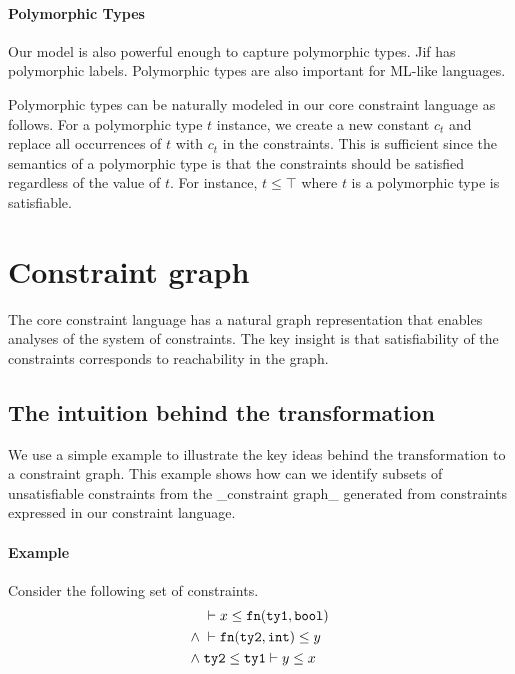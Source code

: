 
\paragraph{Polymorphic Types}

Our model is also powerful enough to capture polymorphic types.  Jif
has polymorphic labels. Polymorphic types are also important for
ML-like languages.

Polymorphic types can be naturally modeled in our core constraint
language as follows. For a polymorphic type $t$ instance, we create a
new constant $c_t$ and replace all occurrences of $t$ with $c_t$ in
the constraints. This is sufficient since the semantics of a
polymorphic type is that the constraints should be satisfied
regardless of the value of $t$. For instance, $t\leq \top$ where $t$
is a polymorphic type is satisfiable.
\fi

\section{Constraint graph} 
\label{sec:graph}

The core constraint language has a natural graph representation that
enables analyses of the system of constraints. The key insight is that
satisfiability of the constraints corresponds to reachability in the
graph.


\subsection{The intuition behind the transformation}

We use a simple example to illustrate the key ideas behind the
transformation to a constraint graph.  This example shows how can we
identify subsets of unsatisfiable constraints from the _constraint
graph_ generated from constraints expressed in our constraint
language.

\paragraph{Example} Consider the following set of constraints.
\begin{align*}
      &\; \vdash x \leq \mathtt{fn} (\mathtt{ty1}, \mathtt{bool}) \\
\land &\; \vdash \mathtt{fn} (\mathtt{ty2}, \mathtt{int}) \leq y \\
\land &\; \mathtt{ty2} \leq \mathtt{ty1} \vdash y \leq x
\end{align*}

